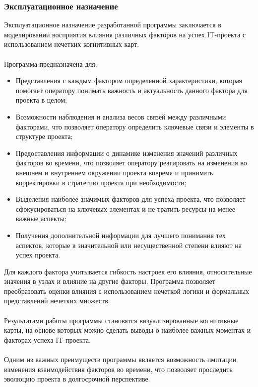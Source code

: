\documentclass{article}
\begin{document}
    \subsubsection {Эксплуатационное назначение}
    Эксплуатационное назначение разработанной программы заключается в моделировании восприятия влияния различных факторов на успех IT-проекта с использованием нечетких когнитивных карт.\\
    ~\\
    Программа предназначена для:
    \begin{itemize}
        \item Представления с каждым фактором определенной характеристики, которая помогает оператору понимать важность и актуальность данного фактора для проекта в целом;
        \item Возможности наблюдения и анализа весов связей между различными факторами, что позволяет оператору определить ключевые связи и элементы в структуре проекта;
        \item Предоставления информации о динамике изменения значений различных факторов во времени, что позволяет оператору реагировать на изменения во внешнем и внутреннем окружении проекта вовремя и принимать корректировки в стратегию проекта при необходимости;
        \item Выделения наиболее значимых факторов для успеха проекта, что позволяет сфокусироваться на ключевых элементах и не тратить ресурсы на менее важные аспекты;
        \item Получения дополнительной информации для лучшего понимания тех аспектов, которые в значительной или несущественной степени влияют на успех проекта.
    \end{itemize}
    Для каждого фактора учитывается гибкость настроек его влияния, относительные значения в узлах и влияние на другие факторы. Программа позволяет преобразовать оценки влияния с использованием нечеткой логики и формальных представлений нечетких множеств.\\
    ~\\
    Результатами работы программы становятся визуализированные когнитивные карты, на основе которых можно сделать выводы о наиболее важных моментах и факторах успеха IT-проекта.\\
    ~\\
    Одним из важных преимуществ программы является возможность имитации изменения взаимодействия факторов во времени, что позволяет проследить эволюцию проекта в долгосрочной перспективе.
\end{document}
